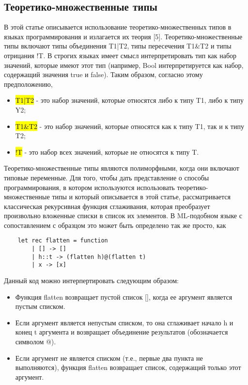 \subsection{Теоретико-множественные типы}

В этой статье описывается использование теоретико-множественных типов в языках программирования и
излагается их теория [5].
Теоретико-множественные типы включают типы объединения T1|T2, типы пересечения
T1\&T2 и типы отрицания !T\@.
В строгих языках имеет смысл интерпретировать тип как набор значений, которые имеют этот тип
(например, Bool интерпретируется как набор, содержащий значения true и false).
Таким образом, согласно этому предположению,

\begin{itemize}[left=2em]
    \item \hl{T1|T2} - это набор значений, которые относятся либо к типу T1, либо к типу Y2;
    \item \hl{T1\&T2} - это набор значений, которые относятся как к типу T1, так и к типу T2;
    \item \hl{!T} - это набор всех значений, которые не относятся к типу T\@.
\end{itemize}

Теоретико-множественные типы являются полиморфными, когда они включают типовые переменные.
Для того, чтобы дать представление о способы программирования, в котором используются использовать теоретико-множественные
типы и который описывается в этой статье, рассматривается классическая рекурсивная функция сглаживания, которая преобразует
произвольно вложенные списки в список их элементов.
В ML-подобном языке с сопоставлением с образцом это может быть определено так же просто, как

\begin{lstlisting}
    let rec flatten = function
        | [] -> []
        | h::t -> (flatten h)@(flatten t)
        | x -> [x]
\end{lstlisting}

Данный код можно интерпертировать следующим образом:

\begin{itemize}[left=2em]
    \item Функция flatten возвращает пустой список [], когда ее аргумент является пустым списком.
    \item Если аргумент является непустым списком, то она сглаживает начало h и конец t аргумента и возвращает объединение
результатов (обозначается символом @).
    \item Если аргумент не является списком (т.е., первые два пункта не выполняются), функция flatten возвращает список,
содержащий только этот аргумент.
\end{itemize}

